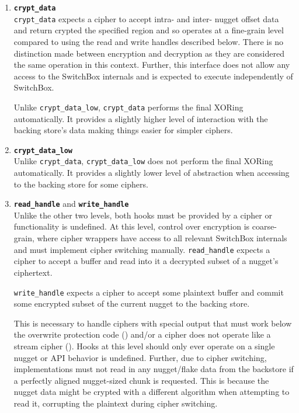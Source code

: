 \begin{enumerate}
   \item \textbf{\texttt{crypt\_data}}\\\texttt{crypt\_data}
   expects a cipher to accept intra- and inter- nugget offset data and return
   crypted the specified region and so operates at a fine-grain level compared
   to using the read and write handles described below. There is no distinction
   made between encryption and decryption as they are considered the same
   operation in this context. Further, this interface does not allow any access
   to the SwitchBox internals and is expected to execute independently of
   SwitchBox.

   Unlike \texttt{crypt\_data\_low}, \texttt{crypt\_data} performs the final
   XORing automatically. It provides a slightly higher level of interaction with
   the backing store's data making things easier for simpler ciphers.

   \item \textbf{\texttt{crypt\_data\_low}}\\Unlike \texttt{crypt\_data},
   \texttt{crypt\_data\_low} does not perform the final XORing automatically. It
   provides a slightly lower level of abstraction when accessing to the backing
   store for some ciphers.

   \item \textbf{\texttt{read\_handle}} and \textbf{\texttt{write\_handle}}\\
   Unlike the other two levels, both hooks must be provided by a cipher or
   functionality is undefined. At this level, control over encryption is
   coarse-grain, where cipher wrappers have access to all relevant SwitchBox
   internals and must implement cipher switching manually. \texttt{read\_handle}
   expects a cipher to accept a buffer and read into it a decrypted subset of a
   nugget's ciphertext.

   \texttt{write\_handle} expects a cipher to accept some plaintext buffer and
   commit some encrypted subset of the current nugget to the backing store.

   This is necessary to handle ciphers with special output that must work
   below the overwrite protection code () and/or a cipher does not
   operate like a stream cipher (). Hooks at this level should only
   ever operate on a single nugget or API behavior is undefined. Further, due to
   cipher switching, implementations must not read in any nugget/flake data from
   the backstore if a perfectly aligned nugget-sized chunk is requested. This is
   because the nugget data might be crypted with a different algorithm when
   attempting to read it, corrupting the plaintext during cipher switching.
\end{enumerate}

